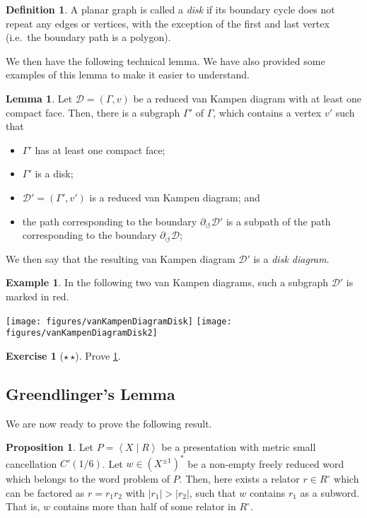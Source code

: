\documentclass[11pt,a4paper,reqno]{amsart}
\theoremstyle{plain}
\theoremstyle{definition}
\newtheorem{lemma}[theorem]{Lemma}
\newtheorem{proposition}[theorem]{Proposition}
\newtheorem{definition}[theorem]{Definition}
\theoremstyle{definition}
\newtheorem{exercise}[theorem]{Exercise}
\newtheorem{example}[theorem]{Example}
\newcommand\exerciseLevelMedium{$\star${\,}$\star$}
\begin{document}
\begin{definition}\label{def:disk-graph}
  A planar graph is called a \emph{disk} if its boundary cycle does not repeat any edges or vertices, with the exception of the first and last vertex (i.e.~the boundary path is a polygon).
\end{definition}

We then have the following technical lemma.
We have also provided some examples of this lemma to make it easier to understand.

\begin{lemma}\label{lem:reduction-to-disk-graph}
  Let $\mathcal D = (\Gamma, v)$ be a reduced van Kampen diagram with at least one compact face.
  Then, there is a subgraph $\Gamma'$ of $\Gamma$, which contains a vertex $v'$ such that
  \begin{itemize}
    \item $\Gamma'$ has at least one compact face;
    \item $\Gamma'$ is a disk;
    \item $\mathcal D' = (\Gamma', v')$ is a reduced van Kampen diagram; and
    \item the path corresponding to the boundary $\partial_\circlearrowleft \mathcal D'$ is a subpath of the path corresponding to the boundary $\partial_\circlearrowleft \mathcal D$;
  \end{itemize}
  We then say that the resulting van Kampen diagram $\mathcal D'$ is a \emph{disk diagram}.
\end{lemma}

\begin{example}
  In the following two van Kampen diagrams, such a subgraph $\mathcal D'$ is marked in red.

{
  \hfill
  \texttt{[image: figures/vanKampenDiagramDisk]}
  \hfill
  \texttt{[image: figures/vanKampenDiagramDisk2]}
  \hfill
}

\end{example}

\begin{exercise}[\exerciseLevelMedium]
  Prove \cref{lem:reduction-to-disk-graph}.
\end{exercise}

\subsection{Greendlinger's Lemma}
We are now ready to prove the following result.

\begin{proposition}\label{prop:small-cancellation-theorem}
  Let $P = \left\langle X \mid R \right\rangle$ be a presentation with metric small cancellation $C'(1/6)$.
  Let $w \in (X^{\pm 1})^*$ be a non-empty freely reduced word which belongs to the word problem of $P$.
  Then, here exists a relator $r \in R^\circ$ which can be factored as $r = r_1 r_2$ with $|r_1| > |r_2|$, such that $w$ contains $r_1$ as a subword.
  That is, $w$ contains more than half of some relator in $R^\circ$.
\end{proposition}
\end{document}
